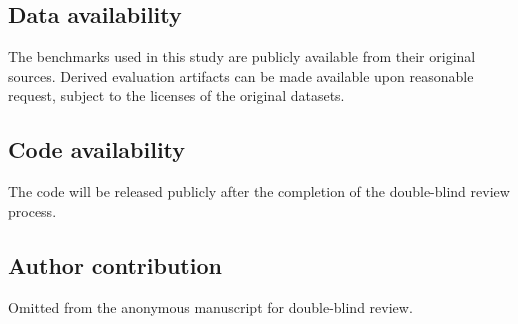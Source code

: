 \documentclass[pdflatex,sn-mathphys-num]{sn-jnl}
\theoremstyle{thmstyleone}
\theoremstyle{thmstyletwo}
\theoremstyle{thmstylethree}
\begin{document}
\subsection*{Data availability}
The benchmarks used in this study are publicly available from their original sources. Derived evaluation artifacts can be made available upon reasonable request, subject to the licenses of the original datasets.

\subsection*{Code availability}
The code will be released publicly after the completion of the double-blind review process.

\subsection*{Author contribution}
Omitted from the anonymous manuscript for double-blind review.


\end{document}
